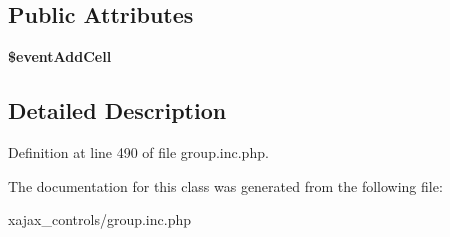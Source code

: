 \subsection*{Public Attributes}
\begin{DoxyCompactItemize}
\item 
\hypertarget{classclsTr_a0d8c06f4f91790ceb847ac382394ca29}{
{\bfseries \$eventAddCell}}
\label{classclsTr_a0d8c06f4f91790ceb847ac382394ca29}

\end{DoxyCompactItemize}


\subsection{Detailed Description}


Definition at line 490 of file group.inc.php.



The documentation for this class was generated from the following file:\begin{DoxyCompactItemize}
\item 
xajax\_\-controls/group.inc.php\end{DoxyCompactItemize}
